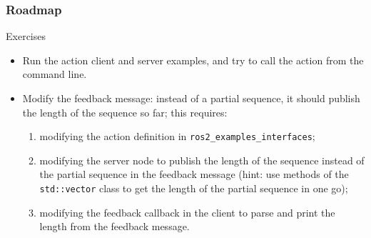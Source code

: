 \documentclass[aspectratio=169]{beamer}
\begin{document}
\frame{\titlepage}



\begin{frame}
	\frametitle{Roadmap}
	\tableofcontents
\end{frame}





\begin{frame}{Exercises}
	\begin{itemize}
		\item Run the action client and server examples, and try to call the action from the command line.
		\item Modify the feedback message: instead of a partial sequence, it should publish the length of the sequence so far; this requires:
		      \begin{enumerate}
			      \item modifying the action definition in \texttt{ros2\_examples\_interfaces};
			      \item modifying the server node to publish the length of the sequence instead of the partial sequence in the feedback message (hint: use methods of the \texttt{std::vector} class to get the length of the partial sequence in one go);
			      \item modifying the feedback callback in the client to parse and print the length from the feedback message.
		      \end{enumerate}
	\end{itemize}
\end{frame}
\end{document}
